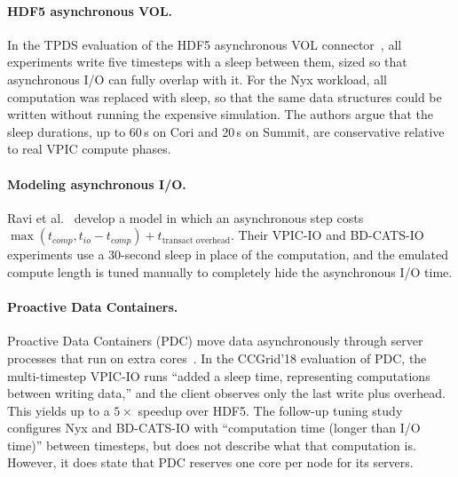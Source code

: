 \paragraph{HDF5 asynchronous VOL.} In the TPDS evaluation of the HDF5
asynchronous VOL connector~\cite{tang2022async}, all experiments write five
timesteps with a sleep between them, sized so that asynchronous I/O can fully
overlap with it. For the Nyx workload, all computation was replaced with
sleep, so that the same data structures could be written without running the
expensive simulation. The authors argue that the sleep durations, up to
60\,s on Cori and 20\,s on Summit, are conservative relative to real VPIC
compute phases.

\paragraph{Modeling asynchronous I/O.} Ravi et al.~\cite{ravi2023evaluating}
develop a model in which an asynchronous step costs
$\max(t_{comp}, t_{io} - t_{comp}) + t_{\text{transact overhead}}$. Their
VPIC-IO and BD-CATS-IO experiments use a 30-second sleep in place of the
computation, and the emulated compute length is tuned manually to completely
hide the asynchronous I/O time.

\paragraph{Proactive Data Containers.} Proactive Data Containers (PDC) move
data asynchronously through server processes that run on extra
cores~\cite{tang2018pdc}. In the CCGrid'18 evaluation of PDC, the
multi-timestep VPIC-IO runs ``added a sleep time, representing computations
between writing data,'' and the client observes only the last write plus
overhead. This yields up to a $5\times$ speedup over HDF5. The follow-up
tuning study~\cite{tang2019pdctune} configures Nyx and BD-CATS-IO with
``computation time (longer than I/O time)'' between timesteps, but does not
describe what that computation is. However, it does state that PDC reserves
one core per node for its servers.


